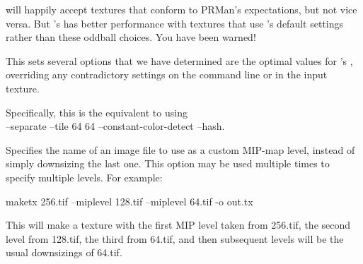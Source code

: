 \OpenImageIO will happily accept textures that conform to PRMan's
expectations, but not vice versa.  But \OpenImageIO's \TextureSystem
has better performance with textures that use \maketx's default settings
rather than these oddball choices.  You have been warned!
\apiend

This sets several options that we have determined are the 
optimal values for \OpenImageIO's \TextureSystem, overriding any
contradictory settings on the command line or in the input texture.

Specifically, this is the equivalent to using \\
 {\cf --separate --tile 64 64 --constant-color-detect --hash}.
\apiend


Specifies the name of an image file to use as a custom MIP-map level, 
instead of simply downsizing the last one.  This option may be used
multiple times to specify multiple levels.  For example:
\begin{code}
    maketx 256.tif --miplevel 128.tif --miplevel 64.tif -o out.tx
\end{code}
This will make a texture with the first MIP level taken from {\cf 256.tif},
the second level from {\cf 128.tif}, the third from {\cf 64.tif}, and
then subsequent levels will be the usual downsizings of {\cf 64.tif}.
\apiend



\begin{comment}

\section{{\cf maketx} Recipes}


This section will give quick examples of common uses of {\cf maketx}.

\subsection*{Converting between file formats}

It's a snap to converting among image formats supported by \product
(i.e., for which \ImageInput and \ImageOutput plugins can be found).
The {\cf maketx} utility will simply infer the file format from the
file extension. The following example converts a PNG image to JPEG:

\begin{code}
    maketx lena.png lena.jpg
\end{code}

\end{comment}
